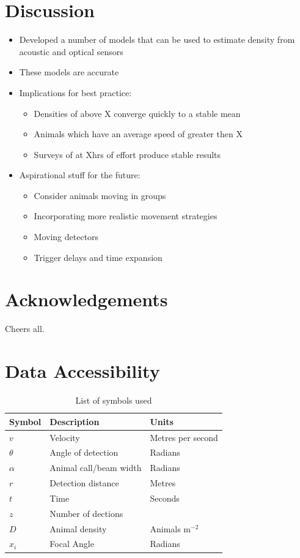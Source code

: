 \documentclass[a4paper,10pt,reqno,oneside]{amsart}
\begin{document}
\section{Discussion}
\begin{itemize}
\item Developed a number of models that can be used to estimate density from acoustic and optical sensors 
\item These models are accurate 
\item Implications for best practice:
	\begin{itemize}
	\item Densities of above X converge quickly to a stable mean
	\item Animals which have an average speed of greater then X 
	\item Surveys of at Xhrs of effort produce stable results
	\end{itemize}
\item Aspirational stuff for the future:
	\begin{itemize}
	\item Consider animals moving in groups
	\item Incorporating more realistic movement strategies
	\item Moving detectors
	\item Trigger delays and time expansion
	\end{itemize}
\end{itemize}




\section{Acknowledgements}
Cheers all.


\section{Data Accessibility}






\begin{table}[t]
\centering
\begin{tabular}{lll}
Symbol 	& Description & Units\\\hline
$v$		& Velocity & Metres per second\\
$\theta$	& Angle of detection & Radians \\
$\alpha$	& Animal call/beam width & Radians \\
$r$ 		& Detection distance & Metres\\
$t$			& Time & Seconds\\
$z$			& Number of dections & \\
$D$		& Animal density & Animals m$^{-2}$ \\
$x_i$	& Focal Angle 	& Radians\\
\end{tabular}
\caption{List of symbols used}
\label{t:paras}
\end{table}



	
	
\end{document}
